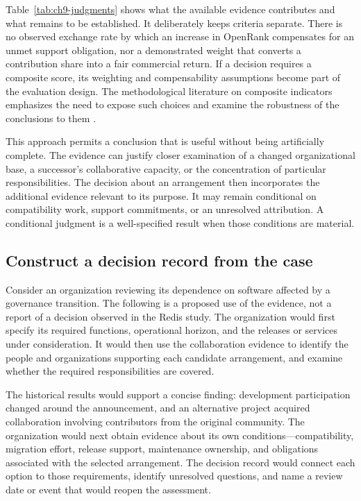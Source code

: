 Table~\ref{tab:ch9-judgments} shows what the available evidence contributes and what remains to be established. It deliberately keeps criteria separate. There is no observed exchange rate by which an increase in OpenRank compensates for an unmet support obligation, nor a demonstrated weight that converts a contribution share into a fair commercial return. If a decision requires a composite score, its weighting and compensability assumptions become part of the evaluation design. The methodological literature on composite indicators emphasizes the need to expose such choices and examine the robustness of the conclusions to them \citep{oecd2008}.



This approach permits a conclusion that is useful without being artificially complete. The evidence can justify closer examination of a changed organizational base, a successor's collaborative capacity, or the concentration of particular responsibilities. The decision about an arrangement then incorporates the additional evidence relevant to its purpose. It may remain conditional on compatibility work, support commitments, or an unresolved attribution. A conditional judgment is a well-specified result when those conditions are material.

\subsection{Construct a decision record from the case}
Consider an organization reviewing its dependence on software affected by a governance transition. The following is a proposed use of the evidence, not a report of a decision observed in the Redis study. The organization would first specify its required functions, operational horizon, and the releases or services under consideration. It would then use the collaboration evidence to identify the people and organizations supporting each candidate arrangement, and examine whether the required responsibilities are covered.

The historical results would support a concise finding: development participation changed around the announcement, and an alternative project acquired collaboration involving contributors from the original community. The organization would next obtain evidence about its own conditions---compatibility, migration effort, release support, maintenance ownership, and obligations associated with the selected arrangement. The decision record would connect each option to those requirements, identify unresolved questions, and name a review date or event that would reopen the assessment.

